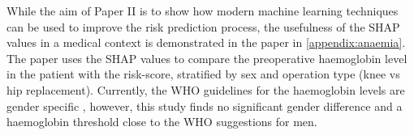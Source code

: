 While the aim of Paper II is to show how modern machine learning techniques can be used to improve the risk prediction process, the usefulness of the SHAP values in a medical context is demonstrated in the paper in \autoref{appendix:anaemia}. The paper uses the SHAP values to compare the preoperative haemoglobin level in the patient with the risk-score, stratified by sex and operation type (knee vs hip replacement). Currently, the WHO guidelines for the haemoglobin levels are gender specific \autocite{anaemiasNutritionalAnaemiasReport1968}, however, this study finds no significant gender difference and a haemoglobin threshold close to the WHO suggestions for men.
